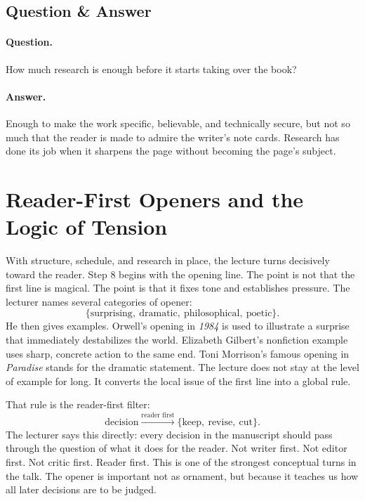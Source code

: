 \subsection{Question \& Answer}

\paragraph{Question.} How much research is enough before it starts taking over the book?

\paragraph{Answer.} Enough to make the work specific, believable, and technically secure, but not so much that the reader is made to admire the writer's note cards. Research has done its job when it sharpens the page without becoming the page's subject.

\section{Reader-First Openers and the Logic of Tension}

With structure, schedule, and research in place, the lecture turns decisively toward the reader. Step 8 begins with the opening line. The point is not that the first line is magical. The point is that it fixes tone and establishes pressure. The lecturer names several categories of opener:
\begin{equation}
\{\text{surprising},\ \text{dramatic},\ \text{philosophical},\ \text{poetic}\}.
\end{equation}
He then gives examples. Orwell's opening in \textit{1984} is used to illustrate a surprise that immediately destabilizes the world. Elizabeth Gilbert's nonfiction example uses sharp, concrete action to the same end. Toni Morrison's famous opening in \textit{Paradise} stands for the dramatic statement. The lecture does not stay at the level of example for long. It converts the local issue of the first line into a global rule.

That rule is the reader-first filter:
\begin{equation}
\text{decision} \xrightarrow{\text{reader first}} \{\text{keep},\ \text{revise},\ \text{cut}\}.
\end{equation}
The lecturer says this directly: every decision in the manuscript should pass through the question of what it does for the reader. Not writer first. Not editor first. Not critic first. Reader first. This is one of the strongest conceptual turns in the talk. The opener is important not as ornament, but because it teaches us how all later decisions are to be judged.

